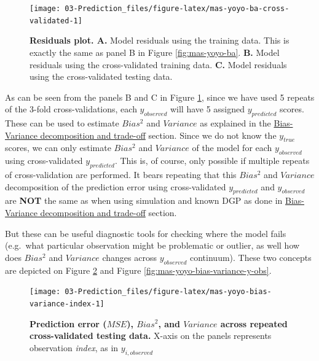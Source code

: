 \documentclass[
]{book}
\begin{document}
\begin{figure}

{\centering \texttt{[image: 03-Prediction\_files/figure-latex/mas-yoyo-ba-cross-validated-1]} 

}

\caption{\textbf{Residuals plot. A. } Model residuals using the training data. This is exactly the same as panel B in Figure \ref{fig:mas-yoyo-ba}. \textbf{B.} Model residuals using the cross-validated training data. \textbf{C.} Model residuals using the cross-validated testing data.}\label{fig:mas-yoyo-ba-cross-validated}
\end{figure}



As can be seen from the panels B and C in Figure \ref{fig:mas-yoyo-ba-cross-validated}, since we have used 5 repeats of the 3-fold cross-validations, each \(y_{observed}\) will have 5 assigned \(y_{predicted}\) scores. These can be used to estimate \(Bias^2\) and \(Variance\) as explained in the \protect\hyperlink{bias-variance-decomposition-and-trade-off}{Bias-Variance decomposition and trade-off} section. Since we do not know the \(y_{true}\) scores, we can only estimate \(Bias^2\) and \(Variance\) of the model for each \(y_{observed}\) using cross-validated \(y_{predicted}\). This is, of course, only possible if multiple repeats of cross-validation are performed. It bears repeating that this \(Bias^2\) and \(Variance\) decomposition of the prediction error using cross-validated \(y_{predicted}\) and \(y_{observed}\) are \textbf{NOT} the same as when using simulation and known DGP as done in \protect\hyperlink{bias-variance-decomposition-and-trade-off}{Bias-Variance decomposition and trade-off} section.

But these can be useful diagnostic tools for checking where the model fails (e.g.~what particular observation might be problematic or outlier, as well how does \(Bias^2\) and \(Variance\) changes across \(y_{observed}\) continuum). These two concepts are depicted on Figure \ref{fig:mas-yoyo-bias-variance-index} and Figure \ref{fig:mas-yoyo-bias-variance-y-obs}.

\begin{figure}

{\centering \texttt{[image: 03-Prediction\_files/figure-latex/mas-yoyo-bias-variance-index-1]} 

}

\caption{\textbf{Prediction error (\(MSE\)), \(Bias^2\), and \(Variance\) across repeated cross-validated testing data. }X-axis on the panels represents observation \emph{index}, as in \(y_{i, observed}\)}\label{fig:mas-yoyo-bias-variance-index}
\end{figure}
\end{document}
